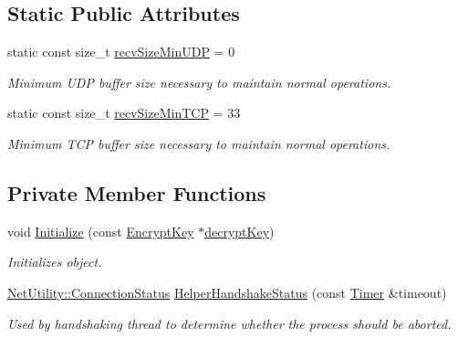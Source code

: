 \subsection*{Static Public Attributes}
\begin{DoxyCompactItemize}
\item 
\hypertarget{class_net_instance_client_a667185822294a7c9f93ddd496e638a24}{
static const size\_\-t \hyperlink{class_net_instance_client_a667185822294a7c9f93ddd496e638a24}{recvSizeMinUDP} = 0}
\label{class_net_instance_client_a667185822294a7c9f93ddd496e638a24}

\begin{DoxyCompactList}\small\item\em Minimum UDP buffer size necessary to maintain normal operations. \item\end{DoxyCompactList}\item 
\hypertarget{class_net_instance_client_af35177f5736c4cc487097de91dae6df4}{
static const size\_\-t \hyperlink{class_net_instance_client_af35177f5736c4cc487097de91dae6df4}{recvSizeMinTCP} = 33}
\label{class_net_instance_client_af35177f5736c4cc487097de91dae6df4}

\begin{DoxyCompactList}\small\item\em Minimum TCP buffer size necessary to maintain normal operations. \item\end{DoxyCompactList}\end{DoxyCompactItemize}
\subsection*{Private Member Functions}
\begin{DoxyCompactItemize}
\item 
void \hyperlink{class_net_instance_client_a5d26a06879c6111dc12aedd7454de74c}{Initialize} (const \hyperlink{class_encrypt_key}{EncryptKey} $\ast$\hyperlink{class_net_instance_client_abfd45e00771b132f08c2aea9bf582a3e}{decryptKey})
\begin{DoxyCompactList}\small\item\em Initializes object. \item\end{DoxyCompactList}\item 
\hyperlink{class_net_utility_a7eae52138f8bd597ffc67ebf07e86b6d}{NetUtility::ConnectionStatus} \hyperlink{class_net_instance_client_ae59a0afcae755a2d07eefe7b4c37c689}{HelperHandshakeStatus} (const \hyperlink{class_timer}{Timer} \&timeout)
\begin{DoxyCompactList}\small\item\em Used by handshaking thread to determine whether the process should be aborted. \item\end{DoxyCompactList}\end{DoxyCompactItemize}

